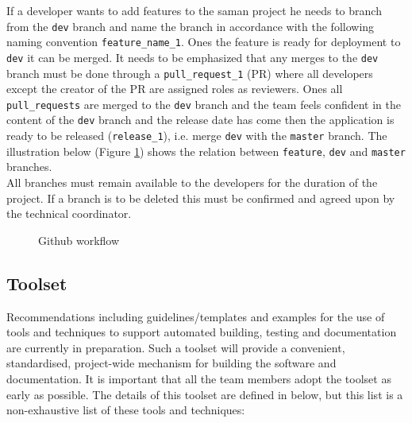 \noindent If a developer wants to add features to the saman project he needs to branch from the \texttt{dev} branch and name the branch in accordance with the following naming convention \texttt{feature\_name\_1}. Ones the feature is ready for deployment to \texttt{dev} it can be merged. It needs to be emphasized that any merges to the \texttt{dev} branch must be done through a \texttt{pull\_request\_1} (PR) where all developers except the creator of the PR are assigned roles as reviewers. Ones all \texttt{pull\_requests} are merged to the \texttt{dev} branch and the team feels confident in the content of the \texttt{dev} branch and the release date has come then the application is ready to be released (\texttt{release\_1}), i.e. merge \texttt{dev} with the \texttt{master} branch. The illustration below (Figure \ref{fig:git_flow}) shows the relation between \texttt{feature}, \texttt{dev} and \texttt{master} branches.\\

\noindent All branches must remain available to the developers for the duration of the project. If a branch is to be deleted this must be confirmed and agreed upon by the technical coordinator.

\begin{figure}
\centering

\caption{Github workflow}
\label{fig:git_flow}
\end{figure}

\subsection{Toolset}

Recommendations including guidelines/templates and examples for the use of tools and techniques to support automated building, testing and documentation are currently in preparation. Such a toolset will provide a convenient, standardised, project-wide mechanism for building the software and documentation. It is important that all the team members adopt the toolset as early as possible. The details of this toolset are defined in below, but this list is a non-exhaustive list of these tools and techniques:

